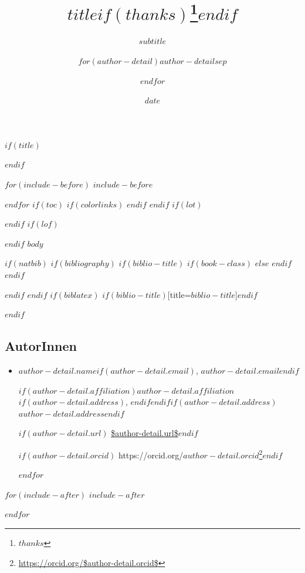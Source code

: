\documentclass[$if(fontsize)$$fontsize$,$endif$$if(lang)$$babel-lang$,$endif$$if(papersize)$$papersize$paper,$endif$$for(classoption)$$classoption$$sep$,$endfor$]{$documentclass$}
\title{$title$$if(thanks)$\thanks{$thanks$}$endif$}
\subtitle{$subtitle$}
\author{$for(author-detail)$$author-detail$$sep$ \and $endfor$}
\institute{$for(institute)$$institute$$sep$ \and $endfor$}
\date{$date$}
\renewcommand{\href}[2]{#2\footnote{\url{#1}}}
\begin{document}
$if(title)$
\maketitle
$endif$

$for(include-before)$
$include-before$

$endfor$
$if(toc)$
{
$if(colorlinks)$
\hypersetup{linkcolor=$if(toccolor)$$toccolor$$else$black$endif$}
$endif$
\setcounter{tocdepth}{$toc-depth$}
\tableofcontents
}
$endif$
$if(lot)$
\listoftables
$endif$
$if(lof)$
\listoffigures
$endif$
$body$

$if(natbib)$
$if(bibliography)$
$if(biblio-title)$
$if(book-class)$
\renewcommand\bibname{$biblio-title$}
$else$
\renewcommand\refname{$biblio-title$}
$endif$
$endif$


$endif$
$endif$
$if(biblatex)$
\printbibliography$if(biblio-title)$[title=$biblio-title$]$endif$

$endif$


\subsection*{AutorInnen}
\begin{itemize}
$for(author-detail)$
\item
$author-detail.name$$if(author-detail.email)$, $author-detail.email$$endif$

$if(author-detail.affiliation)$$author-detail.affiliation$$if(author-detail.address)$, $endif$$endif$$if(author-detail.address)$$author-detail.address$$endif$

$if(author-detail.url)$ \url{$author-detail.url$}$endif$

$if(author-detail.orcid)$ \href{https://orcid.org/$author-detail.orcid$}{https://orcid.org/$author-detail.orcid$}$endif$

$endfor$
\end{itemize}


$for(include-after)$
$include-after$

$endfor$
\end{document}
